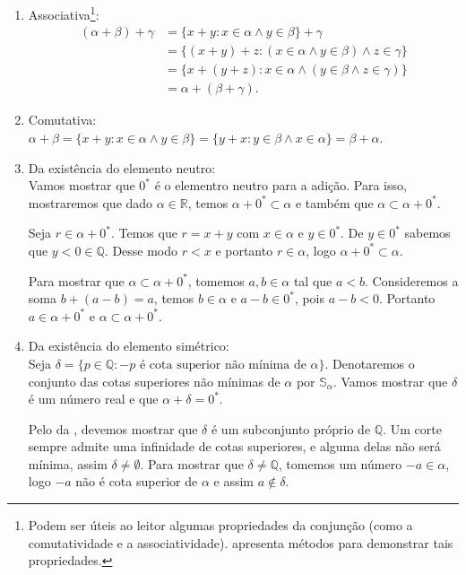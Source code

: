 \documentclass[../main.tex]{subfiles}
\begin{document}
\begin{dem}
\begin{enumerate}[label=(\roman*)]
        \item Associativa\footnote{Podem ser úteis ao leitor algumas propriedades da conjunção (como a comutatividade e a associatividade). \Textcite[p. 147]{mortari} apresenta métodos para demonstrar tais propriedades.}:
            \begin{align*}
                (\alpha+\beta)+\gamma &= \{ x+y: x \in \alpha \land y \in \beta \} + \gamma  \\
                &= \{ (x+y)+z : (x \in \alpha \land y \in \beta) \land z \in \gamma \} \\
                &= \{ x+(y+z) : x \in \alpha \land (y \in \beta \land z \in \gamma) \} \\
                &= \alpha + (\beta + \gamma).
            \end{align*}
            
        \item Comutativa: \\
            $\alpha + \beta = \{ x+y : x \in \alpha \land y \in \beta \} = \{ y+x: y \in \beta \land x \in \alpha \} = \beta + \alpha$.
            
        \item Da existência do elemento neutro: \\
            Vamos mostrar que $0^*$ é o elementro neutro para a adição. Para isso, mostraremos que dado $\alpha \in \mathbb{R}$, temos $\alpha + 0^* \subset \alpha$ e também que $\alpha \subset \alpha + 0^*$.

            Seja $r \in \alpha + 0^*$. Temos que $r = x+y$ com $x \in \alpha$ e $y \in 0^*$. De $y \in 0^*$ sabemos que $y < 0 \in \mathbb{Q}$. Desse modo $r < x$ e portanto $r \in \alpha$, logo $\alpha + 0^* \subset \alpha$.

            Para mostrar que $\alpha \subset \alpha + 0^*$, tomemos $a, b \in \alpha$ tal que $a < b$. Consideremos a soma $b + (a - b) = a$, temos $b \in \alpha$ e $a-b \in 0^*$, pois $a-b < 0$. Portanto $a \in \alpha + 0^*$ e $\alpha \subset \alpha + 0^*$.
        \item Da existência do elemento simétrico: \\
            Seja $\delta = \{ p \in \mathbb{Q} : -p \text{ é cota superior não mínima de } \alpha \}$. Denotaremos o conjunto das cotas superiores não mínimas de $\alpha$ por $\mathbb{S}_{\alpha}$.
            Vamos mostrar que $\delta$ é um número real e que $\alpha + \delta = 0^*$.

            Pelo  da , devemos mostrar que $\delta$ é um subconjunto próprio de $\mathbb{Q}$. Um corte sempre admite uma infinidade de cotas superiores, e alguma delas não será mínima, assim $\delta \neq \emptyset$. Para mostrar que $\delta \neq \mathbb{Q}$, tomemos um número $-a \in \alpha$, logo $-a$ não é cota superior de $\alpha$ e assim $a \not\in \delta$.


\end{enumerate}
\end{dem}
\end{document}
